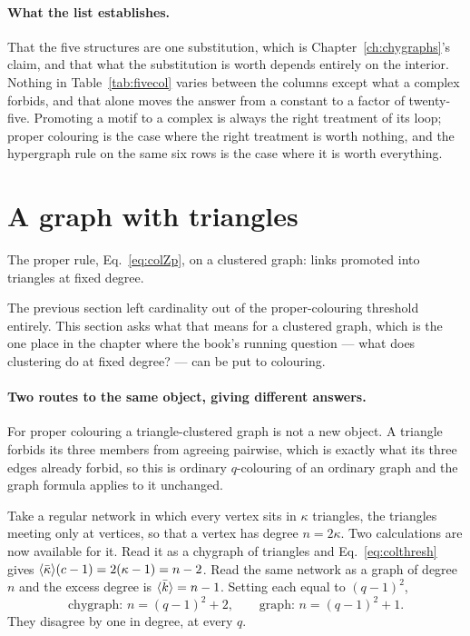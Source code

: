 \paragraph{What the list establishes.} That the five structures are one
substitution, which is Chapter~\ref{ch:chygraphs}'s claim, and that what the
substitution is worth depends entirely on the interior. Nothing in
Table~\ref{tab:fivecol} varies between the columns except what a complex
forbids, and that alone moves the answer from a constant to a factor of
twenty-five. Promoting a motif to a complex is always the right treatment of
its loop; proper colouring is the case where the right treatment is worth
nothing, and the hypergraph rule on the same six rows is the case where it is
worth everything.

\section{A graph with triangles}
\label{sec:colouring-triangles}

The proper rule, Eq.~\eqref{eq:colZp}, on a clustered graph: links promoted into
triangles at fixed degree.

The previous section left cardinality out of the proper-colouring threshold
entirely. This section asks what that means for a clustered graph, which is
the
one place in the chapter where the book's running question --- what does
clustering do at fixed degree? --- can be put to colouring.

\paragraph{Two routes to the same object, giving different answers.} For proper
colouring a triangle-clustered graph is not a new object. A triangle forbids its
three members from agreeing pairwise, which is exactly what its three edges
already forbid, so this is ordinary $q$-colouring of an ordinary graph and the
graph formula applies to it unchanged.

Take a regular network in which every vertex sits in $\kappa$ triangles, the
triangles meeting only at vertices, so that a vertex has degree $n=2\kappa$.
Two calculations are now available for it. Read it as a chygraph of triangles
and Eq.~\eqref{eq:colthresh} gives $\langle \bar\kappa \rangle(c-1)=2(\kappa-1)=n-2$. Read the
same network as a graph of degree $n$ and the excess degree is $\langle \bar
k \rangle=n-1$. Setting each equal to $(q-1)^{2}$,
\begin{equation}
  \text{chygraph: } n=(q-1)^{2}+2,
  \qquad
  \text{graph: } n=(q-1)^{2}+1.
  \label{eq:tridisagree}
\end{equation}
They disagree by one in degree, at every $q$.

